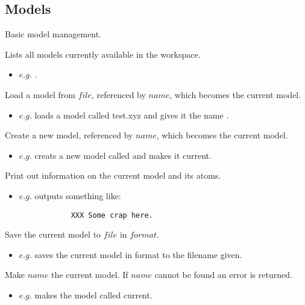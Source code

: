 \subsection{Models}
Basic model management.\\
\begin{description}{\setlength{\itemsep}{2em}}

	\item[listmodels\its] Lists all models currently available in the workspace.
	\begin{itemize}
		\item $e.g.$ .
	\end{itemize}

	\item[loadmodel $file$ $name$\its] Load a model from $file$, referenced by $name$, which becomes the current model.
	\begin{itemize}
		\item $e.g.$  loads a model called test.xyz and gives it the name .
	\end{itemize}

	\item[newmodel $name$\its] Create a new model, referenced by $name$, which becomes the current model.
	\begin{itemize}
		\item $e.g.$  creats a new model called  and makes it current.
	\end{itemize}

	\item[printmodel\its] Print out information on the current model and its atoms.
	\begin{itemize}
		\item $e.g.$  outputs something like:
		\begin{verbatim}
			XXX Some crap here.
		\end{verbatim}
	\end{itemize}

	\item[savemodel $format$ $file$\its] Save the current model to $file$ in $format$.
	\begin{itemize}
		\item $e.g.$  saves the current model in  format to the filename given.
	\end{itemize}

	\item[selectmodel $name$\its] Make $name$ the current model. If $name$ cannot be found an error is returned.
	\begin{itemize}
		\item $e.g.$  makes the model called  current.
	\end{itemize}

\end{description}


